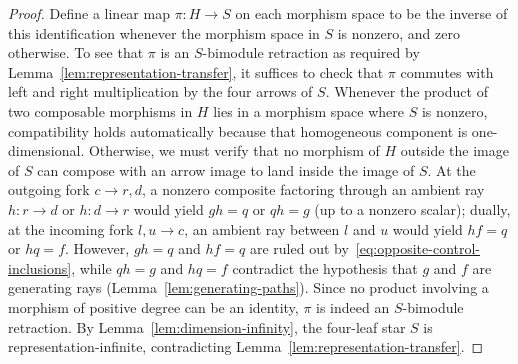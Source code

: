 \begin{proof}
Define a linear map $\pi\colon H\to S$ on each morphism space to be the inverse of this identification whenever the morphism space in $S$ is nonzero, and zero otherwise. To see that $\pi$ is an $S$-bimodule retraction as required by Lemma~\ref{lem:representation-transfer}, it suffices to check that $\pi$ commutes with left and right multiplication by the four arrows of $S$. Whenever the product of two composable morphisms in $H$ lies in a morphism space where $S$ is nonzero, compatibility holds automatically because that homogeneous component is one-dimensional. Otherwise, we must verify that no morphism of $H$ outside the image of $S$ can compose with an arrow image to land inside the image of $S$. At the outgoing fork $c\to r,d$, a nonzero composite factoring through an ambient ray $h\colon r\to d$ or $h\colon d\to r$ would yield $gh=q$ or $qh=g$ (up to a nonzero scalar); dually, at the incoming fork $l,u\to c$, an ambient ray between $l$ and $u$ would yield $hf=q$ or $hq=f$. However, $gh=q$ and $hf=q$ are ruled out by~\eqref{eq:opposite-control-inclusions}, while $qh=g$ and $hq=f$ contradict the hypothesis that $g$ and $f$ are generating rays (Lemma~\ref{lem:generating-paths}). Since no product involving a morphism of positive degree can be an identity, $\pi$ is indeed an $S$-bimodule retraction. By Lemma~\ref{lem:dimension-infinity}, the four-leaf star $S$ is representation-infinite, contradicting Lemma~\ref{lem:representation-transfer}.


\end{proof}
